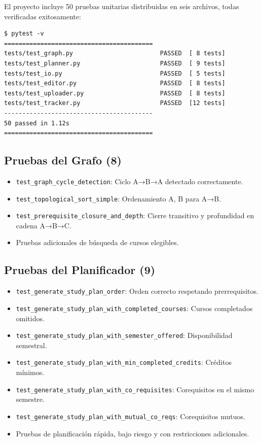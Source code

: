 \documentclass[12pt]{report}
\begin{document}
El proyecto incluye 50 pruebas unitarias distribuidas en seis archivos, todas verificadas exitosamente:

\begin{verbatim}
$ pytest -v
=========================================
tests/test_graph.py                        PASSED  [ 8 tests]
tests/test_planner.py                      PASSED  [ 9 tests]
tests/test_io.py                           PASSED  [ 5 tests]
tests/test_editor.py                       PASSED  [ 8 tests]
tests/test_uploader.py                     PASSED  [ 8 tests]
tests/test_tracker.py                      PASSED  [12 tests]
-----------------------------------------
50 passed in 1.12s
=========================================
\end{verbatim}

\subsection{Pruebas del Grafo (8)}
\begin{itemize}
    \item \texttt{test\_graph\_cycle\_detection}: Ciclo A→B→A detectado correctamente.
    \item \texttt{test\_topological\_sort\_simple}: Ordenamiento A, B para A→B.
    \item \texttt{test\_prerequisite\_closure\_and\_depth}: Cierre transitivo y profundidad en cadena A→B→C.
    \item Pruebas adicionales de búsqueda de cursos elegibles.
\end{itemize}

\subsection{Pruebas del Planificador (9)}
\begin{itemize}
    \item \texttt{test\_generate\_study\_plan\_order}: Orden correcto respetando prerrequisitos.
    \item \texttt{test\_generate\_study\_plan\_with\_completed\_courses}: Cursos completados omitidos.
    \item \texttt{test\_generate\_study\_plan\_with\_semester\_offered}: Disponibilidad semestral.
    \item \texttt{test\_generate\_study\_plan\_with\_min\_completed\_credits}: Créditos mínimos.
    \item \texttt{test\_generate\_study\_plan\_with\_co\_requisites}: Corequisitos en el mismo semestre.
    \item \texttt{test\_generate\_study\_plan\_with\_mutual\_co\_reqs}: Corequisitos mutuos.
    \item Pruebas de planificación rápida, bajo riesgo y con restricciones adicionales.
\end{itemize}
\end{document}
